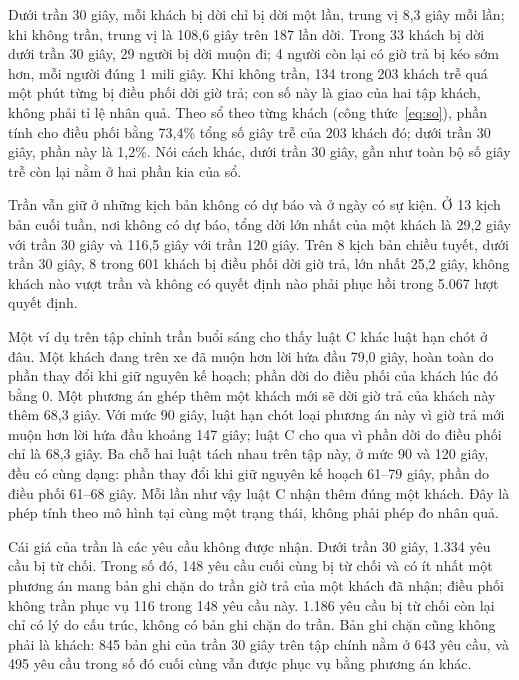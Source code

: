 Dưới trần 30 giây, mỗi khách bị dời chỉ bị dời một lần, trung vị 8,3 giây mỗi lần; khi không trần, trung
vị là 108,6 giây trên 187 lần dời. Trong 33 khách bị dời dưới trần 30 giây, 29 người bị dời muộn đi; 4
người còn lại có giờ trả bị kéo sớm hơn, mỗi người đúng 1 mili giây. Khi không trần, 134 trong 203 khách
trễ quá một phút từng bị điều phối dời giờ trả; con số này là giao của hai tập khách, không phải tỉ lệ
nhân quả. Theo sổ theo từng khách (công thức~\eqref{eq:so}), phần tính cho điều phối bằng 73,4\% tổng số
giây trễ của 203 khách đó; dưới trần 30 giây, phần này là 1,2\%. Nói cách khác, dưới trần 30 giây,
gần như toàn bộ số giây trễ còn lại nằm ở hai phần kia của sổ.

Trần vẫn giữ ở những kịch bản không có dự báo và ở ngày có sự kiện. Ở 13 kịch bản cuối tuần, nơi không có
dự báo, tổng dời lớn nhất của một khách là 29,2 giây với trần 30 giây và 116,5 giây với trần 120 giây. Trên 8
kịch bản chiều tuyết, dưới trần 30 giây, 8 trong 601 khách bị điều phối dời giờ trả, lớn nhất 25,2 giây,
không khách nào vượt trần và không có quyết định nào phải phục hồi trong 5.067 lượt quyết định.

Một ví dụ trên tập chỉnh trần buổi sáng cho thấy luật C khác luật hạn chót ở đâu. Một khách đang trên
xe đã muộn hơn lời hứa đầu 79,0 giây, hoàn toàn do phần thay đổi khi giữ nguyên kế hoạch; phần dời do
điều phối của khách lúc đó bằng 0. Một phương án ghép thêm một khách mới sẽ dời giờ trả của khách này
thêm 68,3 giây. Với mức 90 giây, luật hạn chót loại phương án này vì giờ trả mới muộn hơn lời hứa đầu
khoảng 147 giây; luật C cho qua vì phần dời do điều phối chỉ là 68,3 giây. Ba chỗ hai luật tách nhau trên
tập này, ở mức 90 và 120 giây, đều có cùng dạng: phần thay đổi khi giữ nguyên kế hoạch 61--79 giây, phần do
điều phối 61--68 giây. Mỗi lần như vậy luật C nhận thêm đúng một khách. Đây là phép
tính theo mô hình tại cùng một trạng thái, không phải phép đo nhân quả.

Cái giá của trần là các yêu cầu không được nhận. Dưới trần 30 giây, 1.334 yêu cầu bị từ chối. Trong số
đó, 148 yêu cầu cuối cùng bị từ chối và có ít nhất một phương án mang bản ghi chặn do trần giờ trả của
một khách đã nhận; điều phối không trần phục vụ 116 trong 148 yêu cầu này. 1.186 yêu cầu bị từ chối còn
lại chỉ có lý do cấu trúc, không có bản ghi chặn do trần. Bản ghi chặn cũng không phải là khách: 845 bản
ghi của trần 30 giây trên tập chính nằm ở 643 yêu cầu, và 495 yêu cầu trong số đó cuối cùng vẫn được
phục vụ bằng phương án khác.

